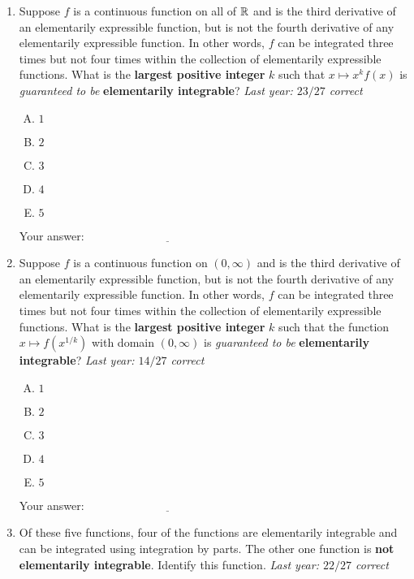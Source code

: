 \documentclass[10pt]{amsart}
\begin{document}
\begin{enumerate}
\item Suppose $f$ is a continuous function on all of $\mathbb{R}$ and is the
  third derivative of an elementarily expressible function, but is not
  the fourth derivative of any elementarily expressible function. In
  other words, $f$ can be integrated three times but not four times
  within the collection of elementarily expressible functions. What is
  the {\bf largest positive integer} $k$ such that $x \mapsto x^kf(x)$
  is {\em guaranteed to be} {\bf elementarily integrable}? {\em Last
  year: $23/27$ correct}

  \begin{enumerate}[(A)]
  \item $1$
  \item $2$
  \item $3$
  \item $4$
  \item $5$
  \end{enumerate}

  \vspace{0.1in}
  Your answer: $\underline{\qquad\qquad\qquad\qquad\qquad\qquad\qquad}$
  \vspace{0.6in}

\item Suppose $f$ is a continuous function on $(0,\infty)$ and is the
  third derivative of an elementarily expressible function, but is not
  the fourth derivative of any elementarily expressible function. In
  other words, $f$ can be integrated three times but not four times
  within the collection of elementarily expressible functions. What is
  the {\bf largest positive integer} $k$ such that the function $x
  \mapsto f(x^{1/k})$ with domain $(0,\infty)$ is {\em guaranteed to
  be} {\bf elementarily integrable}? {\em Last year: $14/27$ correct}

  \begin{enumerate}[(A)]
  \item $1$
  \item $2$
  \item $3$
  \item $4$
  \item $5$
  \end{enumerate}

  \vspace{0.1in}
  Your answer: $\underline{\qquad\qquad\qquad\qquad\qquad\qquad\qquad}$
  \vspace{0.6in}

  
\item Of these five functions, four of the functions are elementarily
  integrable and can be integrated using integration by parts. The
  other one function is {\bf not elementarily integrable}. Identify
  this function. {\em Last year: $22/27$ correct}


\end{enumerate}
\end{document}
